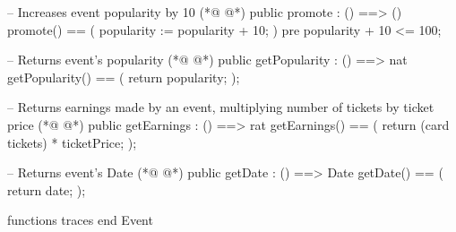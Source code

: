 \begin{vdmpp}[breaklines=true]
 -- Increases event popularity by 10
(*@
\label{promote:88}
@*)
 public promote : () ==> ()
 promote() == (
  popularity := popularity + 10;
 )
 pre popularity + 10 <= 100;
 
 -- Returns event's popularity
(*@
\label{getPopularity:95}
@*)
 public getPopularity : () ==> nat
 getPopularity() == (
  return popularity;
 );
 
 -- Returns earnings made by an event, multiplying number of tickets by ticket price
(*@
\label{getEarnings:101}
@*)
 public getEarnings : () ==> rat
 getEarnings() == (
  return (card tickets) * ticketPrice; 
 );
 
 -- Returns event's Date
(*@
\label{getDate:107}
@*)
 public getDate : () ==> Date
 getDate() == (
  return date;
 );
 
functions  
traces
end Event
\end{vdmpp}
